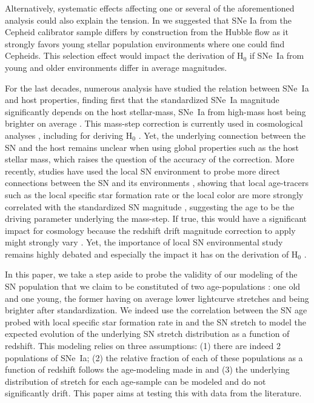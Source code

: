 \documentclass[]{aa} %
\newcommand{\nn}[1]{{\textcolor[rgb]{1, 0.27, 0}{#1}}}
\begin{document}
Alternatively, systematic effects affecting one or several of the aforementioned
analysis could also explain the tension.  In \cite{rigault2015} we suggested
that SNe Ia from the Cepheid calibrator sample differs by construction from  the
Hubble flow as it strongly favors young stellar population environments where
one could find Cepheids. This selection effect would impact the derivation of
H$_0$ if SNe~Ia from young and older environments differ in average magnitudes. 

For the last decades, numerous analysis have studied the relation between SNe~Ia
and host properties\nn{,} finding first that the standardized SNe~Ia magnitude
significantly depends on the host stellar-mass, SNe~Ia from high-mass host
\nn{being brighter on average}
\cite[e.g.][]{kelly2010,sullivan2010,childress2013,betoule2014,rigault2018}.
This mass-step correction is currently used in cosmological analyses
\citep[e.g.][]{betoule2014,scolnic2018a}, including for deriving H$_0$
\citep{riess2016,riess2019}. Yet, the underlying connection between the SN and
the host remains unclear when using global properties such as the host stellar
mass, which raises the question of the accuracy of the correction. More
recently, studies have used the local SN environment to probe more direct
connections between the SN and its environments \citep{rigault2013}\nn{,}
showing that local age-tracers such as the local specific star formation rate or
the local color are more strongly correlated with the standardized SN magnitude
\citep{rigault2018,roman2018}, suggesting the age to be the driving parameter
underlying the mass-step. If true, this would have a significant impact for
cosmology because the redshift drift magnitude correction to apply might
strongly vary \citep{rigault2013,childress2014,scolnic2018a}.  Yet, the
importance of local SN environmental study remains highly debated
\cite[e.g.][]{jones2015,jones2019} and especially the impact it has on the
derivation of H$_0$ \cite{jones2015,riess2016,riess2018,rose2019}. 

In this paper, we take a step aside to probe the validity of our modeling of the
SN population that we claim to be constituted of two age-populations
\citep{rigault2013,rigault2015,rigault2018}: one old and one young, the former
having on average lower lightcurve stretches and being brighter after
standardization. We indeed use the correlation between the SN age probed with
local specific star formation rate in \cite{rigault2018} and the SN stretch to
model the expected evolution of the underlying SN stretch distribution as a
function of redshift. This modeling relies on three assumptions: (1) there
\nn{are indeed} 2 populations of SNe~Ia; (2) the relative fraction of each of
these populations as a function of redshift follows the age-modeling made in
\citep{rigault2018} and (3) the underlying distribution of stretch for each
age-sample can be modeled and do not significantly drift. This paper aims at
testing this with data from the literature. 
\end{document}
